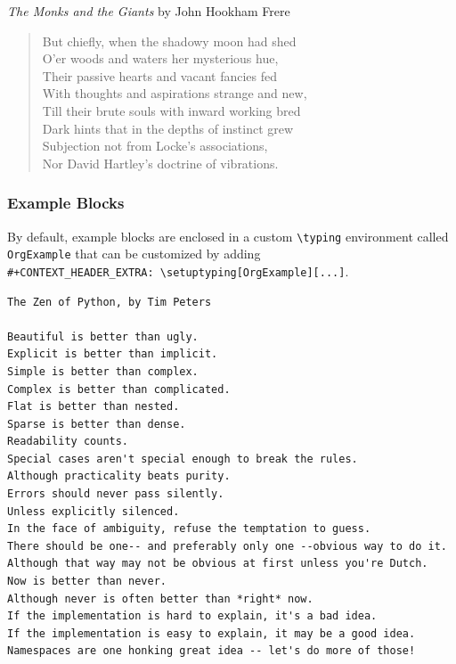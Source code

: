 \documentclass[11pt]{article}
\begin{document}
\emph{The Monks and the Giants} by John Hookham Frere
\begin{verse}
But chiefly, when the shadowy moon had shed\\
\hspace*{2em}O'er woods and waters her mysterious hue,\\
Their passive hearts and vacant fancies fed\\
\hspace*{4em}With thoughts and aspirations strange and new,\\
Till their brute souls with inward working bred\\
\hspace*{5em}Dark hints that in the depths of instinct grew\\
Subjection not from Locke's associations,\\
\hspace*{6em}Nor David Hartley's doctrine of vibrations.\\
\end{verse}
\subsubsection{Example Blocks}
\label{sec:orgf78ec1c}
By default, example blocks are enclosed in a custom \texttt{\textbackslash{}typing} environment
called \texttt{OrgExample} that can be customized by adding\\
\texttt{\#+CONTEXT\_HEADER\_EXTRA: \textbackslash{}setuptyping[OrgExample][...]}.

\begin{verbatim}
The Zen of Python, by Tim Peters

Beautiful is better than ugly.
Explicit is better than implicit.
Simple is better than complex.
Complex is better than complicated.
Flat is better than nested.
Sparse is better than dense.
Readability counts.
Special cases aren't special enough to break the rules.
Although practicality beats purity.
Errors should never pass silently.
Unless explicitly silenced.
In the face of ambiguity, refuse the temptation to guess.
There should be one-- and preferably only one --obvious way to do it.
Although that way may not be obvious at first unless you're Dutch.
Now is better than never.
Although never is often better than *right* now.
If the implementation is hard to explain, it's a bad idea.
If the implementation is easy to explain, it may be a good idea.
Namespaces are one honking great idea -- let's do more of those!
\end{verbatim}
\end{document}
